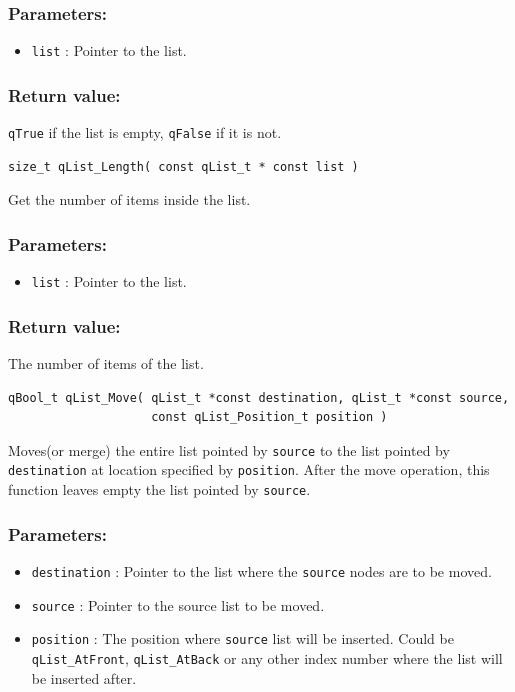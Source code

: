 \documentclass{article}
\begin{document}
\subsubsection*{Parameters:}
\begin{itemize}
    \item \lstinline{list} : Pointer to the list. 
\end{itemize}

\subsubsection*{Return value:}
\lstinline{qTrue} if the list is empty, \lstinline{qFalse} if it is not.


\noindent\hrulefill

\begin{lstlisting}[style=CStyle]
size_t qList_Length( const qList_t * const list )
\end{lstlisting}

Get the number of items inside the list. 

\subsubsection*{Parameters:}
\begin{itemize}
    \item \lstinline{list} : Pointer to the list. 
\end{itemize}

\subsubsection*{Return value:}
The number of items of the list. 

\noindent\hrulefill

\begin{lstlisting}[style=CStyle]
qBool_t qList_Move( qList_t *const destination, qList_t *const source, 
                    const qList_Position_t position )
\end{lstlisting} 

Moves(or merge) the entire list pointed by \lstinline{source} to the list pointed by \lstinline{destination} at location specified by \lstinline{position}. 
After the move operation, this function leaves empty the list pointed by \lstinline{source}.

\subsubsection*{Parameters:}
\begin{itemize}
    \item \lstinline{destination} : Pointer to the list where the \lstinline{source} nodes are to be moved. 
    \item \lstinline{source} : Pointer to the source list to be moved.
    \item \lstinline{position} : The position where \lstinline{source} list will be inserted. Could be \lstinline{qList_AtFront}, \lstinline{qList_AtBack} or any other index number where the list will be inserted after.
\end{itemize}
\end{document}
